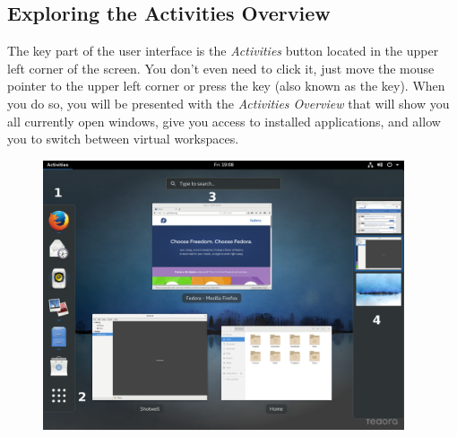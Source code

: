 \subsection*{Exploring the Activities Overview}

The key part of the user interface is the \emph{Activities} button located in the upper left corner of the screen. You don't even need to click it, just move the mouse pointer to the upper left corner or press the  key (also known as the  key). When you do so, you will be presented with the \emph{Activities Overview} that will show you all currently open windows, give you access to installed applications, and allow you to switch between virtual workspaces.

\begin{figure}[ht]
\begin{center}
\includegraphics[width=0.95\textwidth]{img/shell-b}
 \label{fig:shell-b}
\end{center}
\end{figure}

